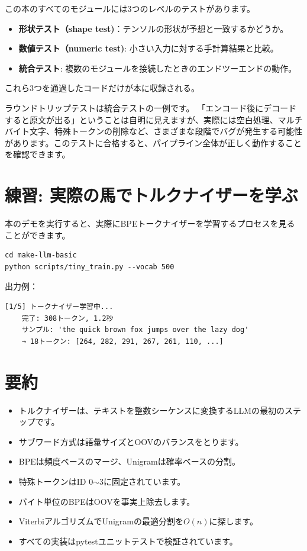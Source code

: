 \begin{notebox}[テスト哲学]
この本のすべてのモジュールには3つのレベルのテストがあります。
\begin{itemize}
\item\textbf{形状テスト（shape test)}：テンソルの形状が予想と一致するかどうか。
\item\textbf{数値テスト（numeric test)}: 小さい入力に対する手計算結果と比較。
\item\textbf{統合テスト}: 複数のモジュールを接続したときのエンドツーエンドの動作。
\end{itemize}
これら3つを通過したコードだけが本に収録される。

ラウンドトリップテストは統合テストの一例です。 「エンコード後にデコードすると原文が出る」ということは自明に見えますが、実際には空白処理、マルチバイト文字、特殊トークンの削除など、さまざまな段階でバグが発生する可能性があります。このテストに合格すると、パイプライン全体が正しく動作することを確認できます。
\end{notebox}

\section{練習: 実際の馬でトルクナイザーを学ぶ}

本のデモを実行すると、実際にBPEトークナイザーを学習するプロセスを見ることができます。

\begin{lstlisting}[style=bashstyle]
cd make-llm-basic
python scripts/tiny_train.py --vocab 500
\end{lstlisting}

出力例：
\begin{lstlisting}[basicstyle=\ttfamily\footnotesize, backgroundcolor=\color{codebg}, frame=single]
[1/5] トークナイザー学習中...
    完了: 308トークン, 1.2秒
    サンプル: 'the quick brown fox jumps over the lazy dog'
    → 18トークン: [264, 282, 291, 267, 261, 110, ...]
\end{lstlisting}

\section{要約}

\begin{itemize}
\item トルクナイザーは、テキストを整数シーケンスに変換するLLMの最初のステップです。
\item サブワード方式は語彙サイズとOOVのバランスをとります。
\item BPEは頻度ベースのマージ、Unigramは確率ベースの分割。
\item 特殊トークンはID 0$\sim$3に固定されています。
\item バイト単位のBPEはOOVを事実上除去します。
\item ViterbiアルゴリズムでUnigramの最適分割を$O(n)$に探します。
\item すべての実装はpytestユニットテストで検証されています。
\end{itemize}


